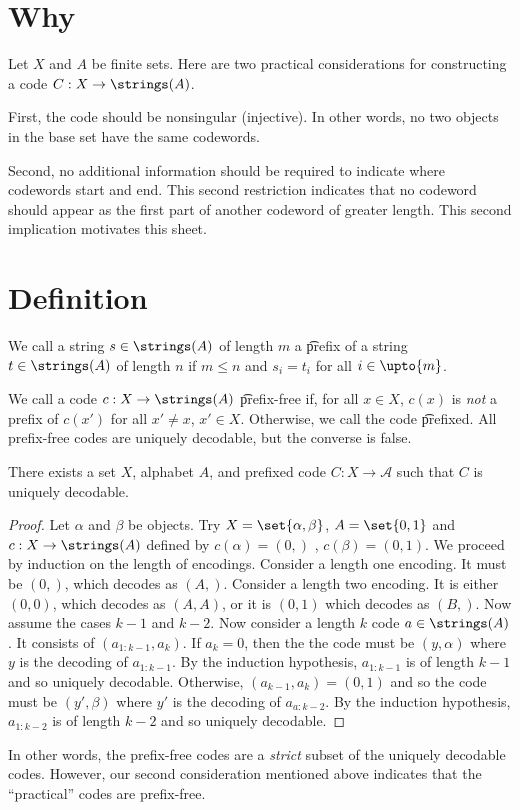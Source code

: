 
\section*{Why}

Let $X$ and $A$ be finite sets.
Here are two practical considerations for constructing a code $C: X \to \strings(A)$.

First, the code should be nonsingular (injective).
In other words, no two objects in the base set have the same codewords.

Second, no additional information should be required to indicate where codewords start and end.
This second restriction indicates that no codeword should appear as the first part of another codeword of greater length.
This second implication motivates this sheet.

\section*{Definition}

We call a string $s \in \strings(A)$ of length $m$ a \t{prefix} of a string $t \in \strings(A)$ of length $n$ if $m \leq n$ and $s_i = t_i$ for all $i \in \upto{m}$.

We call a code $c: X \to \strings(A)$ \t{prefix-free} if, for all $x \in X$, $c(x)$ is \textit{not} a prefix of $c(x')$ for all $x' \neq x$, $x' \in X$.
Otherwise, we call the code \t{prefixed}.
All prefix-free codes are uniquely decodable, but the converse is false.

\begin{proposition}
There exists a set $X$, alphabet $A$, and prefixed code $C: X \to \mathcal{A} $ such that $C$ is uniquely decodable.
\end{proposition}

\begin{proof}Let $\alpha $ and $\beta $ be objects.
Try $X = \set{\alpha , \beta }$, $A = \set{0, 1}$ and $c: X \to \strings(A)$ defined by $c(\alpha ) = (0,)$ , $c(\beta ) = (0,1)$.
We proceed by induction on the length of encodings.
Consider a length one encoding.
It must be $(0,)$, which decodes as $(A,)$.
Consider a length two encoding.
It is either $(0,0)$, which decodes as $(A,A)$, or it is $(0,1)$ which decodes as $(B,)$.
Now assume the cases $k-1$ and $k-2$.
Now consider a length $k$ code $a \in \strings(A)$.
It consists of $(a_{1:k-1},a_k)$.
If $a_k = 0$, then the the code must be $(y, \alpha )$ where $y$ is the decoding of $a_{1:k-1}$.
By the induction hypothesis, $a_{1:k-1}$ is of length $k-1$ and so uniquely decodable.
Otherwise, $(a_{k-1}, a_k) = (0,1)$ and so the code must be $(y', \beta )$ where $y'$ is the decoding of $a_{a:k-2}$.
By the induction hypothesis, $a_{1:k-2}$ is of length $k-2$ and so uniquely decodable.\end{proof}
In other words, the prefix-free codes are a \textit{strict} subset of the uniquely decodable codes.
However, our second consideration mentioned above indicates that the ``practical'' codes are prefix-free.
